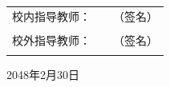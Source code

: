 \begin{titlepage}
\begin{textblock*}{\textwidth}
{\begin{center}
                    \vspace{-0.17cm} %

                    \begin{tabular}[b]{B{4.1cm} B{6.03cm} B{2cm}}
                        {校内指导教师：} &
                                  & {（签名）} \\\\[0.45cm]  %
                        {校外指导教师：} &
                                  & {（签名）} \\ \\[0.45cm]  %
                    \end{tabular}

                \end{center}

                \begin{center}
                    \song \sanhao
                    \hspace{8em}2048年2月30日
                \end{center}
            }\end{textblock*}
    \ %
\end{titlepage}
\newpage